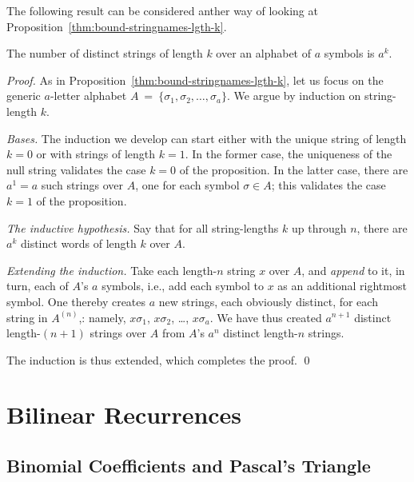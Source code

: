 The following result can be considered anther way of looking at
Proposition~\ref{thm:bound-stringnames-lgth-k}.

\begin{prop}
\label{thm:Num-strings-lgth-k}
The number of distinct strings of length $k$ over an alphabet of $a$
symbols is $a^k$.
\end{prop}

\begin{proof}
As in Proposition~\ref{thm:bound-stringnames-lgth-k}, let us focus on
the generic $a$-letter alphabet $A \ = \ \{\sigma_1, \sigma_2,
\ldots, \sigma_a\}$.  We argue by induction on string-length $k$.

\noindent
{\it Bases.}
The induction we develop can start either with the unique string of
length $k=0$ or with strings of length $k=1$.  In the former case, the
uniqueness of the null string validates the case $k=0$ of the
proposition.  In the latter case, there are $a^1 = a$ such strings
over $A$, one for each symbol $\sigma \in A$; this validates the case
$k=1$ of the proposition.

\noindent
{\it The inductive hypothesis.}
Say that for all string-lengths $k$ up through $n$, there are $a^k$
distinct words of length $k$ over $A$.

\noindent
{\it Extending the induction.}
Take each length-$n$ string $x$ over $A$, and {\em append}
 to it, in turn, each of $A$'s $a$
symbols, i.e., add each symbol to $x$ as an additional rightmost
symbol.  One thereby creates $a$ new strings, each obviously distinct,
for each string in $A^{(n)}$,: namely, $x \sigma_1$, $x \sigma_2$,
\ldots, $x \sigma_a$.  We have thus created $a^{n+1}$ distinct
length-$(n+1)$ strings over $A$ from $A$'s $a^n$ distinct length-$n$
strings.

The induction is thus extended, which completes the proof.  \qed
\end{proof}


\section{Bilinear Recurrences}
\label{sec:bilinear-recurrences}

\subsection{Binomial Coefficients and Pascal's Triangle}
\label{sec:binomial-coeff+Pascal}

